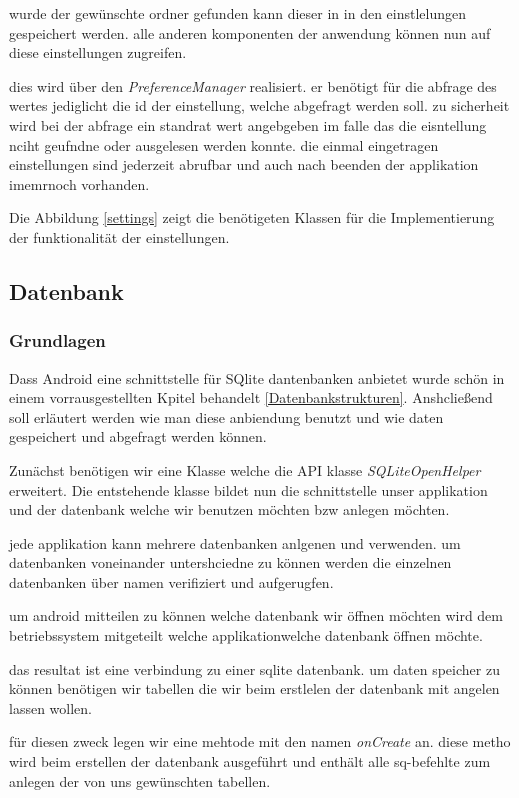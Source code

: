wurde der gewünschte ordner gefunden kann dieser in in den einstlelungen gespeichert werden. alle anderen komponenten der anwendung können nun auf diese einstellungen zugreifen.

dies wird über den \textit{PreferenceManager} realisiert. er benötigt für die abfrage des wertes jediglicht die id der einstellung, welche abgefragt werden soll. zu sicherheit wird bei der abfrage ein standrat wert angebgeben im falle das die eisntellung nciht geufndne oder ausgelesen werden konnte. die einmal eingetragen einstellungen sind jederzeit abrufbar und auch nach beenden der applikation imemrnoch vorhanden.

Die Abbildung \ref{settings} zeigt die benötigeten Klassen für die Implementierung der funktionalität der einstellungen.

\subsection{Datenbank}
\subsubsection{Grundlagen}
Dass Android eine schnittstelle für SQlite dantenbanken anbietet wurde schön in einem vorrausgestellten Kpitel behandelt \ref{Datenbankstrukturen}. Anshcließend soll erläutert werden wie man diese anbiendung benutzt und wie daten gespeichert und abgefragt werden können.

Zunächst benötigen wir eine Klasse welche die API klasse \textit{SQLiteOpenHelper} erweitert. Die entstehende klasse bildet nun die schnittstelle unser applikation und der datenbank welche wir benutzen möchten bzw anlegen möchten.

jede applikation kann mehrere datenbanken anlgenen und verwenden. um datenbanken voneinander untershciedne zu können werden die einzelnen datenbanken über namen verifiziert und aufgerugfen.

um android mitteilen zu können welche datenbank wir öffnen möchten wird dem betriebssystem mitgeteilt welche applikationwelche datenbank öffnen möchte.

das resultat ist eine verbindung zu einer sqlite datenbank. um daten speicher zu können benötigen wir tabellen die wir beim erstlelen der datenbank mit angelen lassen wollen.

für diesen zweck legen wir eine mehtode mit den namen \textit{onCreate} an. diese metho wird beim erstellen der datenbank ausgeführt und enthält alle sq-befehlte zum anlegen der von uns gewünschten tabellen.

